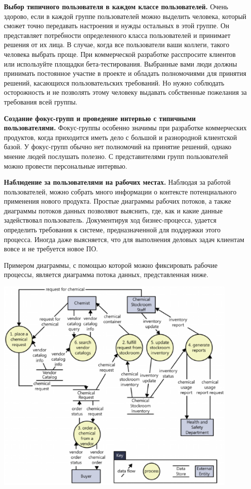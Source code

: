 \documentclass{../../text-style}
\begin{document}
\textbf{Выбор типичного пользователя в каждом классе пользователей.} Очень здорово, если в каждой группе пользователей можно выделить человека, который сможет точно передавать настроения и нужды остальных в этой группе. Он представляет потребности определенного класса пользователей и принимает решения от их лица. В случае, когда все пользователи ваши коллеги, такого человека выбрать проще. При коммерческой разработке расспросите клиентов или используйте площадки бета-тестирования. Выбранные вами люди должны принимать постоянное участие в проекте и обладать полномочиями для принятия решений, касающихся пользовательских требований. Но нужно соблюдать осторожность и не позволять этому человеку выдавать собственные пожелания за требования всей группы.

\textbf{Создание фокус-групп и проведение интервью с типичными пользователями.} Фокус-группы особенно значимы при разработке коммерческих продуктов, когда приходится иметь дело с большой и разнородной клиентской базой. У фокус-групп обычно нет полномочий на принятие решений, однако мнение людей послушать полезно. С представителями групп пользователей можно провести персональные интервью.

\textbf{Наблюдение за пользователями на рабочих местах.} Наблюдая за работой пользователей, можно собрать много информации о контексте потенциального применения нового продукта. Простые диаграммы рабочих потоков, а также диаграммы потоков данных позволяют выяснить, где, как и какие данные задействовал пользователь. Документируя ход бизнес-процесса, удается определить требования к системе, предназначенной для поддержки этого процесса. Иногда даже выясняется, что для выполнения деловых задач клиентам вовсе и не требуется новое ПО.

Примером диаграммы, с помощью которой можно фиксировать рабочие процессы, является диаграмма потока данных, представленная ниже. 

\begin{center}
    \includegraphics[width=0.9\textwidth]{dfd.png}
\end{center}
\end{document}
